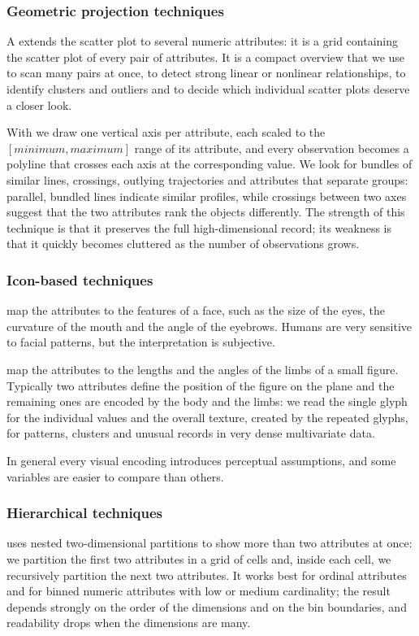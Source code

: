 \subsubsection{Geometric projection techniques}
A  extends the scatter plot to several numeric attributes: it is a grid containing the scatter plot of every pair of attributes. It is a compact overview that we use to scan many pairs at once, to detect strong linear or nonlinear relationships, to identify clusters and outliers and to decide which individual scatter plots deserve a closer look.

With  we draw one vertical axis per attribute, each scaled to the $[\mathit{minimum},\mathit{maximum}]$ range of its attribute, and every observation becomes a polyline that crosses each axis at the corresponding value. We look for bundles of similar lines, crossings, outlying trajectories and attributes that separate groups: parallel, bundled lines indicate similar profiles, while crossings between two axes suggest that the two attributes rank the objects differently. The strength of this technique is that it preserves the full high-dimensional record; its weakness is that it quickly becomes cluttered as the number of observations grows.

\subsubsection{Icon-based techniques}
 map the attributes to the features of a face, such as the size of the eyes, the curvature of the mouth and the angle of the eyebrows. Humans are very sensitive to facial patterns, but the interpretation is subjective.

 map the attributes to the lengths and the angles of the limbs of a small figure. Typically two attributes define the position of the figure on the plane and the remaining ones are encoded by the body and the limbs: we read the single glyph for the individual values and the overall texture, created by the repeated glyphs, for patterns, clusters and unusual records in very dense multivariate data.

In general every visual encoding introduces perceptual assumptions, and some variables are easier to compare than others.

\subsubsection{Hierarchical techniques}
 uses nested two-dimensional partitions to show more than two attributes at once: we partition the first two attributes in a grid of cells and, inside each cell, we recursively partition the next two attributes. It works best for ordinal attributes and for binned numeric attributes with low or medium cardinality; the result depends strongly on the order of the dimensions and on the bin boundaries, and readability drops when the dimensions are many.


